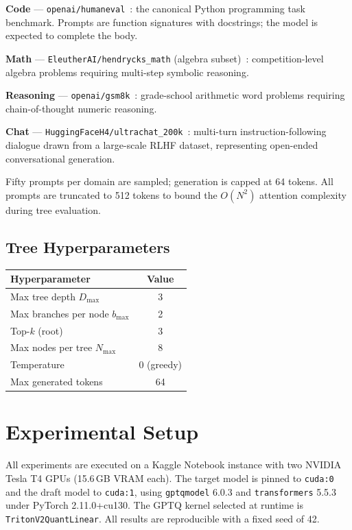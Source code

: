 \documentclass[conference]{IEEEtran}
\begin{document}
\textbf{Code} --- \texttt{openai/humaneval}~\cite{chen2021evaluating}: the
canonical Python programming task benchmark. Prompts are function signatures
with docstrings; the model is expected to complete the body.

\textbf{Math} --- \texttt{EleutherAI/hendrycks\_math} (algebra
subset)~\cite{hendrycks2021measuring}: competition-level algebra problems
requiring multi-step symbolic reasoning.

\textbf{Reasoning} --- \texttt{openai/gsm8k}~\cite{cobbe2021training}:
grade-school arithmetic word problems requiring chain-of-thought numeric
reasoning.

\textbf{Chat} --- \texttt{HuggingFaceH4/ultrachat\_200k}~\cite{ding2023enhancing}:
multi-turn instruction-following dialogue drawn from a large-scale RLHF
dataset, representing open-ended conversational generation.

Fifty prompts per domain are sampled; generation is capped at 64 tokens.
All prompts are truncated to 512 tokens to bound the $O(N^2)$ attention
complexity during tree evaluation.

\subsection{Tree Hyperparameters}
\begin{center}
\begin{tabular}{lc}
\toprule
Hyperparameter & Value \\
\midrule
Max tree depth $D_{\max}$ & 3 \\
Max branches per node $b_{\max}$ & 2 \\
Top-$k$ (root) & 3 \\
Max nodes per tree $N_{\max}$ & 8 \\
Temperature & 0 (greedy) \\
Max generated tokens & 64 \\
\bottomrule
\end{tabular}
\end{center}

\section{Experimental Setup}

All experiments are executed on a Kaggle Notebook instance with two NVIDIA
Tesla T4 GPUs (15.6\,GB VRAM each). The target model is pinned to
\texttt{cuda:0} and the draft model to \texttt{cuda:1}, using
\texttt{gptqmodel} 6.0.3 and \texttt{transformers} 5.5.3 under PyTorch
2.11.0+cu130. The GPTQ kernel selected at runtime is \texttt{TritonV2QuantLinear}.
All results are reproducible with a fixed seed of 42.
\end{document}
